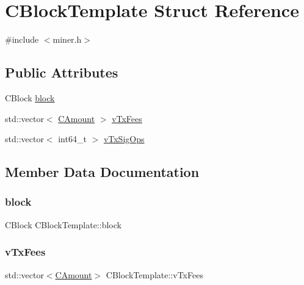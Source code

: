 \hypertarget{struct_c_block_template}{}\section{C\+Block\+Template Struct Reference}
\label{struct_c_block_template}


{\ttfamily \#include $<$miner.\+h$>$}

\subsection*{Public Attributes}
\begin{DoxyCompactItemize}
\item 
C\+Block \mbox{\hyperlink{struct_c_block_template_a13261cbac4dc94f996d1b3ff78e41139}{block}}
\item 
std\+::vector$<$ \mbox{\hyperlink{amount_8h_a4eaf3a5239714d8c45b851527f7cb564}{C\+Amount}} $>$ \mbox{\hyperlink{struct_c_block_template_a66287bde795cc8e8c8cb59c4e2302d49}{v\+Tx\+Fees}}
\item 
std\+::vector$<$ int64\+\_\+t $>$ \mbox{\hyperlink{struct_c_block_template_a13326eb92a7d2fc073d9f5660dfcdde5}{v\+Tx\+Sig\+Ops}}
\end{DoxyCompactItemize}


\subsection{Member Data Documentation}
\mbox{\label{struct_c_block_template_a13261cbac4dc94f996d1b3ff78e41139}} 
\subsubsection{\texorpdfstring{block}{block}}
{\footnotesize\ttfamily C\+Block C\+Block\+Template\+::block}

\mbox{\label{struct_c_block_template_a66287bde795cc8e8c8cb59c4e2302d49}} 
\subsubsection{\texorpdfstring{v\+Tx\+Fees}{vTxFees}}
{\footnotesize\ttfamily std\+::vector$<$\mbox{\hyperlink{amount_8h_a4eaf3a5239714d8c45b851527f7cb564}{C\+Amount}}$>$ C\+Block\+Template\+::v\+Tx\+Fees}

